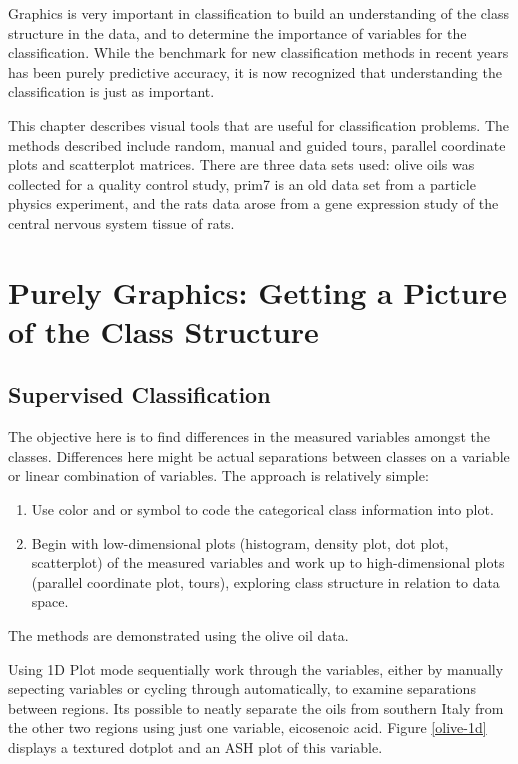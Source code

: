 \documentclass{article}
\begin{document}
Graphics is very important in classification to build an understanding
of the class structure in the data, and to determine the importance of
variables for the classification. While the benchmark for new
classification methods in recent years has been purely predictive
accuracy, it is now recognized that understanding the classification
is just as important.

This chapter describes visual tools that are useful for classification
problems.  The methods described include random, manual and guided
tours, parallel coordinate plots and scatterplot matrices. There are
three data sets used: olive oils was collected for a quality control
study, prim7 is an old data set from a particle physics experiment,
and the rats data arose from a gene expression study of the central
nervous system tissue of rats.


\section{Purely Graphics: Getting a Picture of the Class Structure}

\subsection{Supervised Classification}

The objective here is to find differences in the measured variables
amongst the classes. Differences here might be actual separations
between classes on a variable or linear combination of variables. The
approach is relatively simple:

\begin{enumerate}
\item
Use color and or symbol to code the categorical class information into
plot.

\item  
Begin with low-dimensional plots (histogram, density plot, dot plot,
scatterplot) of the measured variables and work up to high-dimensional
plots (parallel coordinate plot, tours), exploring class structure in
relation to data space.
\end{enumerate}

The methods are demonstrated using the olive oil data.


Using 1D Plot mode sequentially work through the variables, either by
manually sepecting variables or cycling through automatically, to
examine separations between regions. Its possible to neatly separate
the oils from southern Italy from the other two regions using just one
variable, eicosenoic acid. Figure \ref{olive-1d} displays a textured
dotplot and an ASH plot of this variable.
\end{document}
